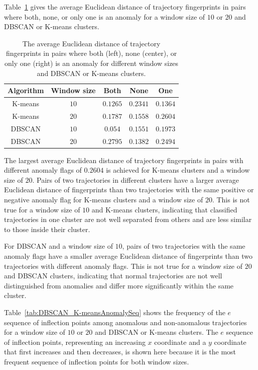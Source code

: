 \documentclass[preprint,12pt]{elsarticle}
\begin{document}
Table~\ref{tab:DBSCAN_K-meansAnomalyEuclid} gives the average Euclidean distance of trajectory fingerprints in pairs where both, none, or only one is an anomaly for a window size of $10$ or $20$ and DBSCAN or K-means clusters.

\begin{table}[!ht]
    \centering
    \begin{tabular}{|c|c|c|c|c|} \hline
        Algorithm & Window size & Both & None & One \\ \hline
        K-means & $10$ & $0.1265$ & $0.2341$ & $0.1364$ \\ \hline
        K-means & $20$ & $0.1787$ & $0.1558$ & $0.2604$ \\ \hline
        DBSCAN & $10$ & $0.054$ & $0.1551$ & $0.1973$ \\ \hline
        DBSCAN & $20$ & $0.2795$ & $0.1382$ & $0.2494$ \\ \hline
    \end{tabular}
    \caption{The average Euclidean distance of trajectory fingerprints in pairs where both (left), none (center), or only one (right) is an anomaly for different window sizes and DBSCAN or K-means clusters.}
    \label{tab:DBSCAN_K-meansAnomalyEuclid}
\end{table}

The largest average Euclidean distance of trajectory fingerprints in pairs with different anomaly flags of $0.2604$ is achieved for K-means clusters and a window size of $20$. Pairs of two trajectories in different clusters have a larger average Euclidean distance of fingerprints than two trajectories with the same positive or negative anomaly flag for K-means clusters and a window size of $20$. This is not true for a window size of $10$ and K-means clusters, indicating that classified trajectories in one cluster are not well separated from others and are less similar to those inside their cluster.

For DBSCAN and a window size of $10$, pairs of two trajectories with the same anomaly flags have a smaller average Euclidean distance of fingerprints than two trajectories with different anomaly flags. This is not true for a window size of $20$ and DBSCAN clusters, indicating that normal trajectories are not well distinguished from anomalies and differ more significantly within the same cluster.

Table~\ref{tab:DBSCAN_K-meansAnomalySeq} shows the frequency of the $e$ sequence of inflection points among anomalous and non-anomalous trajectories for a window size of $10$ or $20$ and DBSCAN or K-means clusters. The $e$ sequence of inflection points, representing an increasing $x$ coordinate and a $y$ coordinate that first increases and then decreases, is shown here because it is the most frequent sequence of inflection points for both window sizes.
\end{document}
